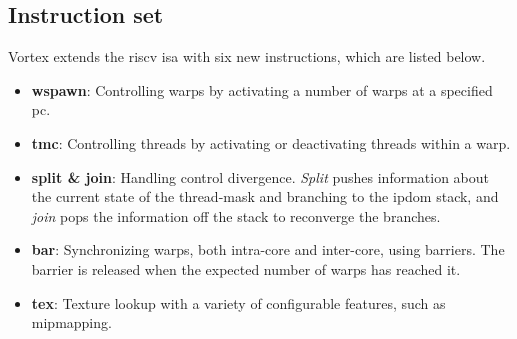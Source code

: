 \subsection{Instruction set}

Vortex extends the \gls{riscv} \acrshort{isa} \cite{riscv-isa} with six new instructions, which are listed below.
\begin{itemize}
    \item \textbf{wspawn}: Controlling warps by activating a number of warps at a specified \acrshort{pc}.
    \item \textbf{tmc}: Controlling threads by activating or deactivating threads within a warp. 
    \item \textbf{split \& join}: Handling control divergence. \textit{Split} pushes information about the current state of the thread-mask and branching to the \acrfull{ipdom} stack, and \textit{join} pops the information off the stack to reconverge the branches.
    \item \textbf{bar}: Synchronizing warps, both intra-core and inter-core, using barriers. The barrier is released when the expected number of warps has reached it.  
    \item \textbf{tex}: Texture lookup with a variety of configurable features, such as mipmapping. 
\end{itemize}
